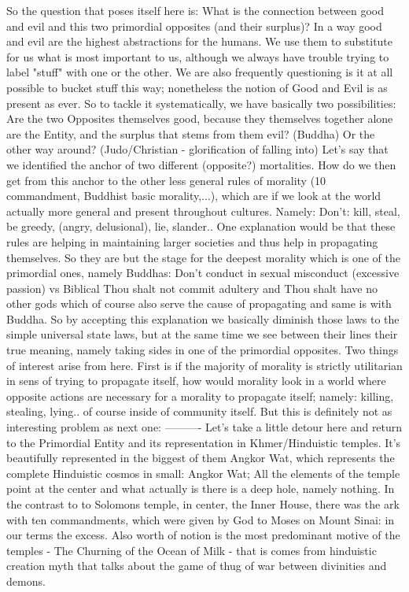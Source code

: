\documentclass[10pt]{book}
\begin{document}
So the question that poses itself here is: What is the connection between good and evil and this two primordial opposites (and their surplus)?
In a way good and evil are the highest abstractions for the humans. We use them to substitute for us what is most important to us, although we always have trouble trying to label "stuff" with one or the other. We are also frequently questioning is it at all possible to bucket stuff this way; nonetheless the notion of Good and Evil is as present as ever. 
So to tackle it systematically, we have basically two possibilities: Are the two Opposites themselves good, because they themselves together alone are the Entity, and the surplus that stems from them evil? (Buddha) Or the other way around? (Judo/Christian - glorification of falling into)
Let's say that we identified the anchor of two different (opposite?) mortalities. How do we then get from this anchor to the other less general rules of morality (10 commandment, Buddhist basic morality,...), which are if we look at the world actually more general and present throughout cultures. Namely: Don't: kill, steal, be greedy, (angry, delusional), lie, slander.. One explanation would be that these rules are helping in maintaining larger societies and thus help in propagating themselves. So they are but the stage for the deepest morality which is one of the primordial ones, namely Buddhas: Don't conduct in sexual misconduct (excessive passion) vs Biblical Thou shalt not commit adultery and Thou shalt have no other gods which of course also serve the cause of propagating and same is with Buddha.
So by accepting this explanation we basically diminish those laws to the simple universal state laws, but at the same time we see between their lines their true meaning, namely taking sides in one of the primordial opposites. Two things of interest arise from here. First is if the majority of morality is strictly utilitarian in sens of trying to propagate itself, how would morality look in a world where opposite actions are necessary for a morality to propagate itself; namely: killing, stealing, lying.. of course inside of community itself. But this is definitely not as interesting problem as next one: 
----------
Let's take a little detour here and return to the Primordial Entity and its representation in Khmer/Hinduistic temples. It's beautifully represented in the biggest of them Angkor Wat, which represents the complete Hinduistic cosmos in small: Angkor Wat; All the elements of the temple point at the center and what actually is there is a deep hole, namely nothing. In the contrast to to Solomons temple, in center, the Inner House, there was the ark with ten commandments, which were given by God to Moses on Mount Sinai: in our terms the excess. Also worth of notion is the most predominant motive of the temples - The Churning of the Ocean of Milk - that is comes from hinduistic creation myth that talks about the game of thug of war between divinities and demons.
\end{document}

